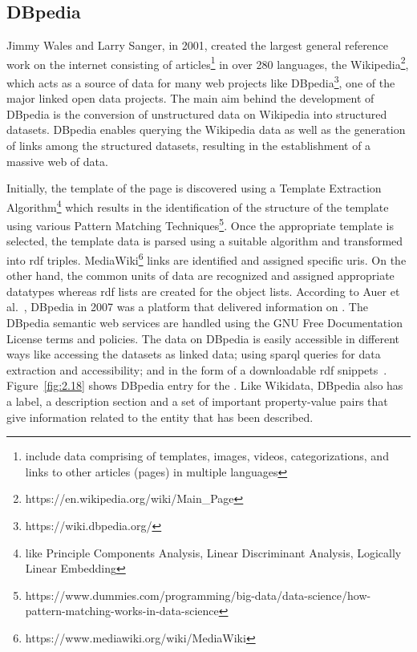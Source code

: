 \begin{doublespace}
\subsection{DBpedia}
\par Jimmy Wales and Larry Sanger, in 2001, created the largest general reference work on the internet consisting of articles\footnote{include data comprising of templates, images, videos, categorizations, and links to other articles (pages) in multiple languages} in over 280 languages, the Wikipedia\footnote{https://en.wikipedia.org/wiki/Main\_Page}, which acts as a source of data for many web projects like DBpedia\footnote{https://wiki.dbpedia.org/}, one of the major linked open data projects. The main aim behind the development of DBpedia is the conversion of unstructured data on Wikipedia into structured datasets. DBpedia enables querying the Wikipedia data as well as the generation of links among the structured datasets, resulting in the establishment of a massive web of data.
\par Initially, the template of the page is discovered using a Template Extraction Algorithm\footnote{like Principle Components Analysis, Linear Discriminant Analysis, Logically Linear Embedding} which results in the identification of the structure of the template using various Pattern Matching Techniques\footnote{https://www.dummies.com/programming/big-data/data-science/how-pattern-matching-works-in-data-science}. Once the appropriate template is selected, the template data is parsed using a suitable algorithm and transformed into \ac{rdf} triples. MediaWiki\footnote{https://www.mediawiki.org/wiki/MediaWiki} links are identified and assigned specific \ac{uri}s. On the other hand, the common units of data are recognized  and assigned appropriate datatypes whereas \ac{rdf} lists are created for the object lists. According to Auer et al.~\cite{auer2007dbpedia}, DBpedia in 2007 was a platform that delivered information on . The DBpedia semantic web services are handled using the GNU Free Documentation License terms and policies. The data on DBpedia is easily accessible in different ways like accessing the datasets as linked data; using \ac{sparql} queries for data extraction and accessibility; and in the form of a downloadable \ac{rdf} snippets~\cite{bizer2009dbpedia}. Figure~\ref{fig:2.18} shows DBpedia entry for the . Like Wikidata, DBpedia also has a label, a description section and a set of important property-value pairs that give information related to the entity that has been described.

\end{doublespace}
